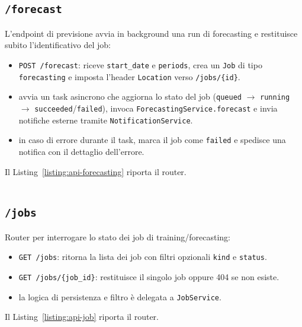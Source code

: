 \subsection{\texttt{/forecast}}
\label{sec:code-api-forecasting}
L’endpoint di previsione avvia in background una run di forecasting e restituisce subito l’identificativo del job:
\begin{itemize}
    \item \texttt{POST /forecast}: riceve \texttt{start\_date} e \texttt{periods}, crea un \texttt{Job} di tipo \texttt{forecasting} e imposta l’header \texttt{Location} verso \texttt{/jobs/\{id\}}.
    \item avvia un task asincrono che aggiorna lo stato del job (\texttt{queued} $\rightarrow$ \texttt{running} $\rightarrow$ \texttt{succeeded}/\texttt{failed}), invoca \texttt{ForecastingService.forecast} e invia notifiche esterne tramite \texttt{NotificationService}.
    \item in caso di errore durante il task, marca il job come \texttt{failed} e spedisce una notifica con il dettaglio dell’errore.
\end{itemize}
Il Listing~\ref{listing:api-forecasting} riporta il router.
\captionsetup{type=listing, belowskip=0pt}
\inputminted[fontsize=\small, breaklines, breakanywhere=true, linenos=true, bgcolor=gray!10]{python}{code/api/forecasting.py}
\label{listing:api-forecasting}

\subsection{\texttt{/jobs}}
\label{sec:code-api-job}
Router per interrogare lo stato dei job di training/forecasting:
\begin{itemize}
    \item \texttt{GET /jobs}: ritorna la lista dei job con filtri opzionali \texttt{kind} e \texttt{status}.
    \item \texttt{GET /jobs/\{job\_id\}}: restituisce il singolo job oppure 404 se non esiste.
    \item la logica di persistenza e filtro è delegata a \texttt{JobService}.
\end{itemize}
Il Listing~\ref{listing:api-job} riporta il router.
\captionsetup{type=listing, belowskip=0pt}
\inputminted[fontsize=\small, breaklines, breakanywhere=true, linenos=true, bgcolor=gray!10]{python}{code/api/job.py}
\label{listing:api-job}

